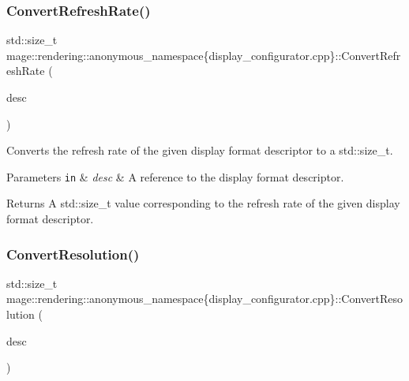 \subsubsection{\texorpdfstring{Convert\+Refresh\+Rate()}{ConvertRefreshRate()}}
{\footnotesize\ttfamily std\+::size\+\_\+t mage\+::rendering\+::anonymous\+\_\+namespace\{display\+\_\+configurator.\+cpp\}\+::Convert\+Refresh\+Rate (\begin{DoxyParamCaption}\item[{const D\+X\+G\+I\+\_\+\+M\+O\+D\+E\+\_\+\+D\+E\+SC \&}]{desc }\end{DoxyParamCaption})\hspace{0.3cm}{\ttfamily [noexcept]}}

Converts the refresh rate of the given display format descriptor to a {\ttfamily std\+::size\+\_\+t}.


\begin{DoxyParams}[1]{Parameters}
\mbox{\tt in}  & {\em desc} & A reference to the display format descriptor. \\
\hline
\end{DoxyParams}
\begin{DoxyReturn}{Returns}
A {\ttfamily std\+::size\+\_\+t} value corresponding to the refresh rate of the given display format descriptor. 
\end{DoxyReturn}
\mbox{\label{namespacemage_1_1rendering_1_1anonymous__namespace_02display__configurator_8cpp_03_a0cb1426e2dba7938d75a2f9ec1e9e0a6}} 
\subsubsection{\texorpdfstring{Convert\+Resolution()}{ConvertResolution()}}
{\footnotesize\ttfamily std\+::size\+\_\+t mage\+::rendering\+::anonymous\+\_\+namespace\{display\+\_\+configurator.\+cpp\}\+::Convert\+Resolution (\begin{DoxyParamCaption}\item[{const D\+X\+G\+I\+\_\+\+M\+O\+D\+E\+\_\+\+D\+E\+SC \&}]{desc }\end{DoxyParamCaption})\hspace{0.3cm}{\ttfamily [noexcept]}}


